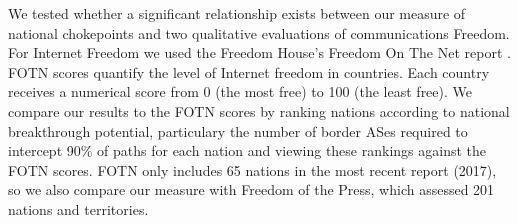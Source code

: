 We tested whether a significant relationship exists between our measure of
national chokepoints and two qualitative evaluations of communications Freedom. For
Internet Freedom we used the Freedom House's Freedom On The Net report
\cite{FOTN}. FOTN scores quantify the level of Internet freedom in countries.
Each country receives a numerical score from 0 (the most free) to 100 (the
least free). We compare our results to the FOTN scores by ranking nations
according to national breakthrough potential, particulary the number of border
ASes required to intercept 90\% of paths for each nation and viewing these
rankings against the FOTN scores. FOTN only includes 65 nations in the most recent
report (2017), so we also compare our measure with Freedom of the Press, which assessed
201 nations and territories.


